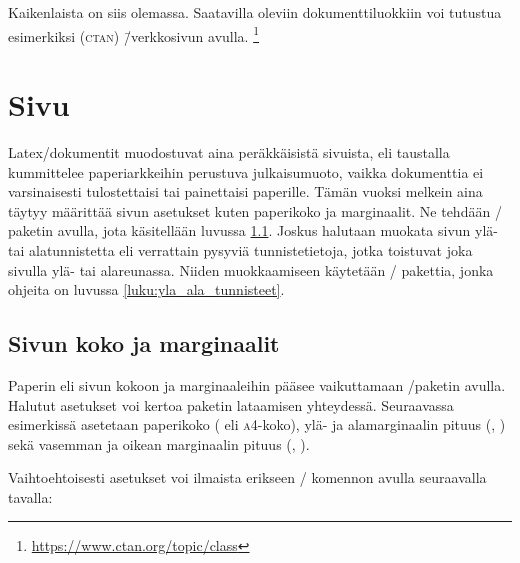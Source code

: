 Kaikenlaista on siis olemassa. Saatavilla oleviin dokumenttiluokkiin voi
tutustua esimerkiksi 
(\textsc{ctan}) \=/verkkosivun avulla.%
\footnote{\url{https://www.ctan.org/topic/class}}

\section{Sivu}
\label{luku:sivuasetukset}

Latex\-/dokumentit muodostuvat aina peräkkäisistä sivuista, eli
taustalla kummittelee paperiarkkeihin perustuva julkaisumuoto, vaikka
dokumenttia ei varsinaisesti tulostettaisi tai painettaisi paperille.
Tämän vuoksi melkein aina täytyy määrittää sivun asetukset kuten
paperikoko ja marginaalit. Ne tehdään \-/ paketin
avulla, jota käsitellään luvussa \ref{luku:sivun_mitat}. Joskus halutaan
muokata sivun ylä- tai alatunnistetta eli verrattain pysyviä
tunnistetietoja, jotka toistuvat joka sivulla ylä- tai alareunassa.
Niiden muokkaamiseen käytetään \-/ pakettia, jonka
ohjeita on luvussa \ref{luku:yla_ala_tunnisteet}.

\subsection{Sivun koko ja marginaalit}
\label{luku:sivun_mitat}

Paperin eli sivun kokoon ja marginaaleihin pääsee vaikuttamaan
\-/paketin avulla. Halutut asetukset
voi kertoa paketin lataamisen yhteydessä. Seuraavassa esimerkissä
asetetaan paperikoko ( eli \textsc{a4}-koko), ylä- ja
alamarginaalin pituus (, ) sekä vasemman ja
oikean marginaalin pituus (, ).

\begin{koodilohkosis}
\usepackage[a4paper, top=20mm, bottom=30mm,
  left=20mm, right=20mm]{geometry}
\end{koodilohkosis}

Vaihtoehtoisesti asetukset voi ilmaista erikseen \-/
komennon avulla seuraavalla tavalla:

\begin{koodilohkosis}
\usepackage{geometry}
\geometry{a4paper, top=20mm, bottom=30mm, left=20mm, right=20mm}
\end{koodilohkosis}

